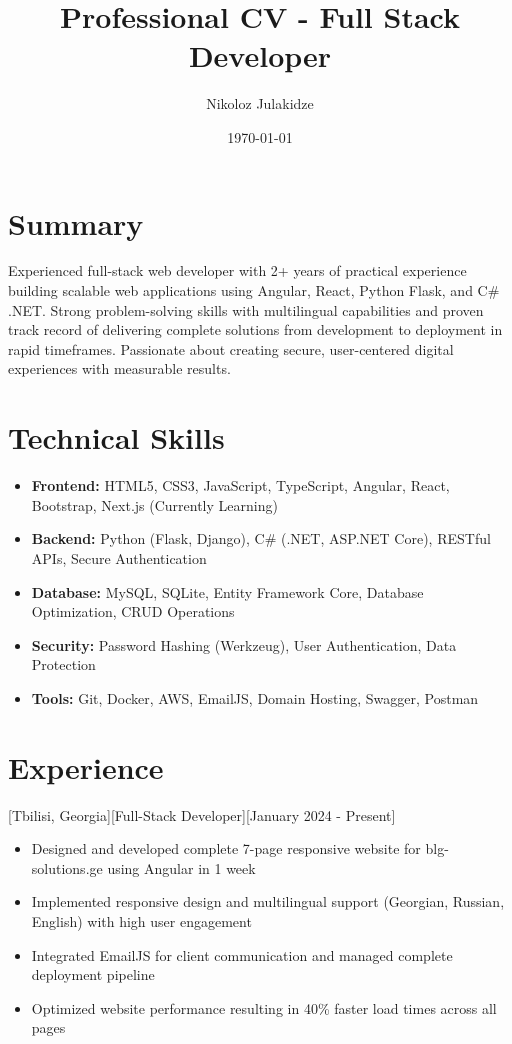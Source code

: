 \documentclass{article}
\title{Professional CV - Full Stack Developer}
\author{Nikoloz Julakidze}
\date{\today}
\begin{document}
\makecvtitle

\section{Summary}
Experienced full-stack web developer with 2+ years of practical experience building scalable web applications using Angular, React, Python Flask, and C\# .NET. Strong problem-solving skills with multilingual capabilities and proven track record of delivering complete solutions from development to deployment in rapid timeframes. Passionate about creating secure, user-centered digital experiences with measurable results.

\section{Technical Skills}
\begin{itemize}[leftmargin=*, itemsep=0pt]
\item \textbf{Frontend:} HTML5, CSS3, JavaScript, TypeScript, Angular, React, Bootstrap, Next.js (Currently Learning)
\item \textbf{Backend:} Python (Flask, Django), C\# (.NET, ASP.NET Core), RESTful APIs, Secure Authentication
\item \textbf{Database:} MySQL, SQLite, Entity Framework Core, Database Optimization, CRUD Operations
\item \textbf{Security:} Password Hashing (Werkzeug), User Authentication, Data Protection
\item \textbf{Tools:} Git, Docker, AWS, EmailJS, Domain Hosting, Swagger, Postman
\end{itemize}

\section{Experience}
[Tbilisi, Georgia][Full-Stack Developer][January 2024 - Present]
\begin{itemize}[leftmargin=*, itemsep=0pt]
\item Designed and developed complete 7-page responsive website for blg-solutions.ge using Angular in 1 week
\item Implemented responsive design and multilingual support (Georgian, Russian, English) with high user engagement
\item Integrated EmailJS for client communication and managed complete deployment pipeline
\item Optimized website performance resulting in 40\% faster load times across all pages
\end{itemize}
\end{document}
